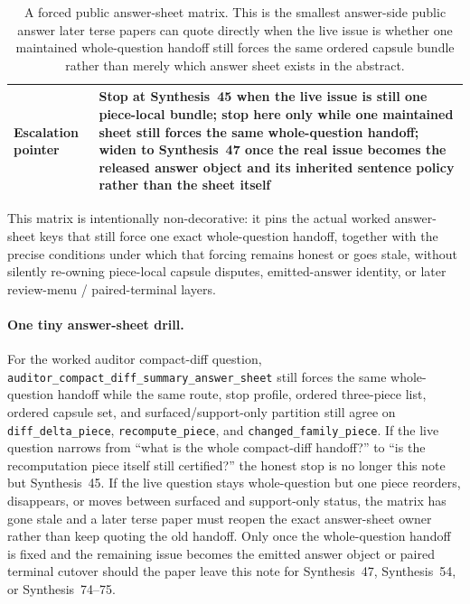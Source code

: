 \documentclass[11pt]{article}
\begin{document}
\begin{table}[t]
\begin{tabularx}{\linewidth}{@{}lX@{}}
Escalation pointer & Stop at Synthesis~45 when the live issue is still one piece-local bundle; stop here only while one maintained sheet still forces the same whole-question handoff; widen to Synthesis~47 once the real issue becomes the released answer object and its inherited sentence policy rather than the sheet itself \\
\bottomrule
\end{tabularx}
\caption{A forced public answer-sheet matrix. This is the smallest answer-side public answer later terse papers can quote directly when the live issue is whether one maintained whole-question handoff still forces the same ordered capsule bundle rather than merely which answer sheet exists in the abstract.}
\label{tab:forced-public-answer-sheet-matrix}
\end{table}

This matrix is intentionally non-decorative: it pins the actual worked answer-sheet keys that still force one exact whole-question handoff, together with the precise conditions under which that forcing remains honest or goes stale, without silently re-owning piece-local capsule disputes, emitted-answer identity, or later review-menu / paired-terminal layers.\cite{series:workedexample}

\paragraph{One tiny answer-sheet drill.}
For the worked auditor compact-diff question, \nolinkurl{auditor_compact_diff_summary_answer_sheet} still forces the same whole-question handoff while the same route, stop profile, ordered three-piece list, ordered capsule set, and surfaced/support-only partition still agree on \nolinkurl{diff_delta_piece}, \nolinkurl{recompute_piece}, and \nolinkurl{changed_family_piece}. If the live question narrows from ``what is the whole compact-diff handoff?'' to ``is the recomputation piece itself still certified?'' the honest stop is no longer this note but Synthesis~45. If the live question stays whole-question but one piece reorders, disappears, or moves between surfaced and support-only status, the matrix has gone stale and a later terse paper must reopen the exact answer-sheet owner rather than keep quoting the old handoff. Only once the whole-question handoff is fixed and the remaining issue becomes the emitted answer object or paired terminal cutover should the paper leave this note for Synthesis~47, Synthesis~54, or Synthesis~74--75.\cite{series:workedexample}
\end{document}
